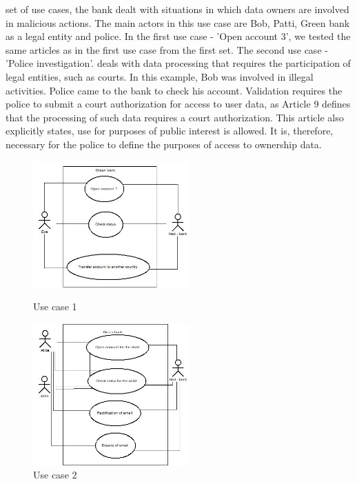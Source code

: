 \documentclass[11pt,english]{article}
\begin{document}
set of use cases, the bank dealt with situations in which data owners are involved in malicious actions. The main actors in this use case are Bob, Patti, Green bank as a legal entity and police. In the first use case - 'Open account 3', we tested the same articles as in the first use case from the first set. The second use case - 'Police investigation'. deals with data processing that requires the participation of legal entities, such as courts. In this example, Bob was involved in illegal activities. Police came to the bank to check his account. Validation requires the police to submit a court authorization for access to user data, as Article 9 defines that the processing of such data requires a court authorization. This article also explicitly states, use for purposes of public interest is allowed. It is, therefore, necessary for the police to define the purposes of access to ownership data.
\begin{figure}[H]
\centering
\begin{minipage}{.5\textwidth}
  \centering
  \includegraphics[width=6cm,scale=0.5]{images/use case1.jpg}
  \caption{Use case 1}
  \label{fig:usecase1}
\end{minipage}%
\begin{minipage}{.5\textwidth}
  \centering
  \includegraphics[width=6cm,scale=0.5]{images/use case2.jpg}
  \caption{Use case 2}
  \label{fig:usecase2}
\end{minipage}
\end{figure}
\end{document}
